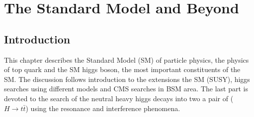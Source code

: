 \graphicspath{{chapt_dutch/}{intro/}{chapt2/}{chapt3/}{chapt4/}{chapt5/}{chapt6/}{chapt7/}{chapt8/}}

\renewcommand\evenpagerightmark{{\scshape\small Chapter 2}}
\renewcommand\oddpageleftmark{{\scshape\small The Standard Model and Beyond}}

\renewcommand{\bibname}{References}

\hyphenation{}

\chapter[The Standard Model and Beyond]%
{The Standard Model and Beyond}\label{chapt:3}
\section*{Introduction}
This chapter describes the Standard Model (SM) of particle physics, the physics of top quark and the SM higgs boson, the most important constituents of the SM. The discussion follows introduction to the extensions the SM (SUSY), higgs searches using different models and CMS searches in BSM area. The last part is devoted to the search of the neutral heavy higgs decays into two a pair of ($H \rightarrow t\bar{t}$) using the resonance and interference phenomena.    
